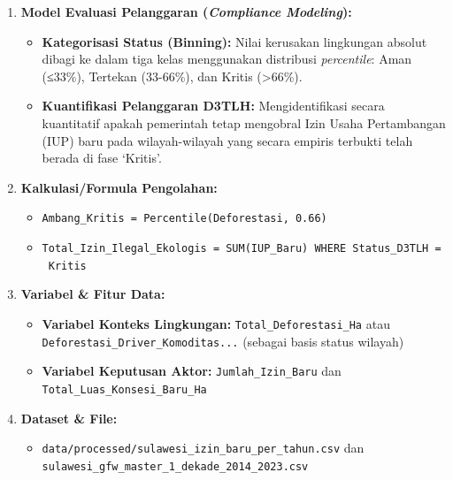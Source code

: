 \documentclass[
]{article}
\providecommand{\tightlist}{%
  \setlength{\itemsep}{0pt}\setlength{\parskip}{0pt}}
\begin{document}
\begin{enumerate}
\def\labelenumi{\arabic{enumi}.}
\tightlist
\item
  \textbf{Model Evaluasi Pelanggaran (\emph{Compliance Modeling}):}

  \begin{itemize}
  \tightlist
  \item
    \textbf{Kategorisasi Status (Binning):} Nilai kerusakan lingkungan
    absolut dibagi ke dalam tiga kelas menggunakan distribusi
    \emph{percentile}: Aman (≤33\%), Tertekan (33-66\%), dan Kritis
    (\textgreater66\%).
  \item
    \textbf{Kuantifikasi Pelanggaran D3TLH:} Mengidentifikasi secara
    kuantitatif apakah pemerintah tetap mengobral Izin Usaha
    Pertambangan (IUP) baru pada wilayah-wilayah yang secara empiris
    terbukti telah berada di fase `Kritis'.
  \end{itemize}
\item
  \textbf{Kalkulasi/Formula Pengolahan:}

  \begin{itemize}
  \tightlist
  \item
    \texttt{Ambang\_Kritis\ =\ Percentile(Deforestasi,\ 0.66)}
  \item
    \texttt{Total\_Izin\_Ilegal\_Ekologis\ =\ SUM(IUP\_Baru)\ WHERE\ Status\_D3TLH\ =\ \textquotesingle{}Kritis\textquotesingle{}}
  \end{itemize}
\item
  \textbf{Variabel \& Fitur Data:}

  \begin{itemize}
  \tightlist
  \item
    \textbf{Variabel Konteks Lingkungan:}
    \texttt{Total\_Deforestasi\_Ha} atau
    \texttt{Deforestasi\_Driver\_Komoditas...} (sebagai basis status
    wilayah)
  \item
    \textbf{Variabel Keputusan Aktor:} \texttt{Jumlah\_Izin\_Baru} dan
    \texttt{Total\_Luas\_Konsesi\_Baru\_Ha}
  \end{itemize}
\item
  \textbf{Dataset \& File:}

  \begin{itemize}
  \tightlist
  \item
    \texttt{data/processed/sulawesi\_izin\_baru\_per\_tahun.csv} dan
    \texttt{sulawesi\_gfw\_master\_1\_dekade\_2014\_2023.csv}
  \end{itemize}
\end{enumerate}
\end{document}
